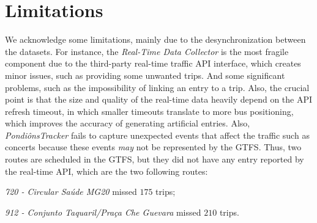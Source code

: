 \section{Limitations}
We acknowledge some limitations, mainly due to the desynchronization
between the datasets. For instance, the {\em Real-Time Data Collector} is the most fragile component due
to the third-party real-time traffic API interface, which creates minor issues,
such as providing some unwanted trips. And some significant problems, such as 
the impossibility of linking an entry to a trip. Also, the crucial point is that the size and quality of 
the real-time data heavily depend on the API refresh timeout, in which smaller
timeouts translate to more bus positioning, which improves the accuracy of generating
artificial entries.
Also, \textit{PondiônsTracker} fails to capture unexpected events that affect the traffic such as concerts because these events {\em may} not be represented by the GTFS. 
Thus, two routes are scheduled in the GTFS, but they did not have any entry reported by the real-time API, which are 
the two following routes:
\begin{enumerate*}
    \item \textit{720 - Circular Saúde MG20} missed $175$ trips;
    \item \textit{912 - Conjunto Taquaril/Praça Che Guevara} missed $210$ trips.
\end{enumerate*}


